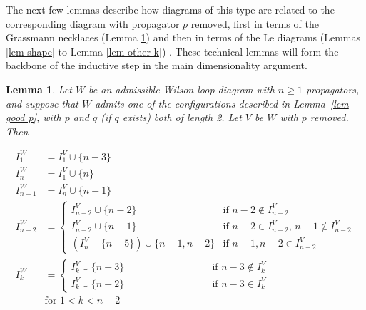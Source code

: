\documentclass[11pt]{article}
\newtheorem{lem}[thm]{Lemma}
\theoremstyle{remark}
\theoremstyle{definition}
\begin{document}
The next few lemmas describe how diagrams of this type are related to the corresponding diagram with propagator $p$ removed, first in terms of the Grassmann necklaces (Lemma \ref{lem I}) and then in terms of the Le diagrams (Lemmas \ref{lem shape} to Lemma \ref{lem other k}) . These technical lemmas will form the backbone of the inductive step in the main dimensionality argument.

\begin{lem}\label{lem I}
Let $W$ be an admissible Wilson loop diagram with $n\geq 1$ propagators, and suppose that $W$ admits one of the configurations described in Lemma~\ref{lem good p}, with $p$ and $q$ (if $q$ exists) both of length 2. Let $V$ be $W$ with $p$ removed.  Then

  \begin{align*}
    I_1^{W} & = I_1^{V} \cup \{n-3\} \\
    I_n^{W} & = I_1^{V} \cup \{n\} \\
    I_{n-1}^{W} & = I_n^{V} \cup \{n-1\} \\
    I_{n-2}^{W} & =
    \begin{cases}
      I_{n-2}^{V}\cup \{n-2\} & \text{if $n-2\not\in I_{n-2}^{V}$} \\
      I_{n-2}^{V}\cup \{n-1\} & \text{if $n-2\in I_{n-2}^{V}$, $n-1\not\in I_{n-2}^{V}$} \\
      (I_{n}^{V} - \{n-5\})\cup \{n-1,n-2\} & \text{if $n-1, n-2\in I_{n-2}^{V}$}
    \end{cases} \\
    I_{k}^{W} & =
    \begin{cases}
      I_k^{V}\cup \{n-3\} & \qquad \qquad \qquad \qquad \text{if $n-3 \not\in I_k^{V}$}\\
      I_k^{V}\cup\{n-2\} & \qquad \qquad \qquad \qquad \text{if $n-3\in I_k^{V}$}
    \end{cases} \\
    & \text{for $1<k<n-2$}
  \end{align*}
\end{lem}
\end{document}
